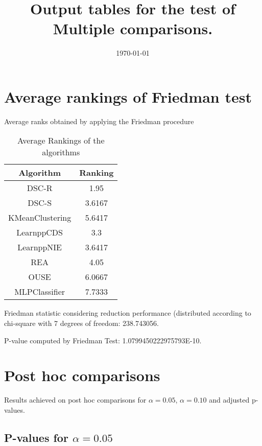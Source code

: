 \documentclass[a4paper,10pt]{article}
\title{Output tables for the test of Multiple comparisons.}
\author{}
\date{\today}
\begin{document}
\begin{landscape}
\pagestyle{empty}
\maketitle
\thispagestyle{empty}
\section{Average rankings of Friedman test}



Average ranks obtained by applying the Friedman procedure

\begin{table}[!htp]
\centering
\begin{tabular}{|c|c|}\hline
Algorithm&Ranking\\\hline
DSC-R & 1.95\\
DSC-S & 3.6167\\
KMeanClustering & 5.6417\\
LearnppCDS & 3.3\\
LearnppNIE & 3.6417\\
REA & 4.05\\
OUSE & 6.0667\\
MLPClassifier & 7.7333\\
\hline
\end{tabular}
\caption{Average Rankings of the algorithms}
\end{table}

Friedman statistic considering reduction performance (distributed according to chi-square with 7 degrees of freedom: 238.743056.

P-value computed by Friedman Test: 1.0799450222975793E-10.\newline



\pagebreak

\section{Post hoc comparisons}

Results achieved on post hoc comparisons for $\alpha = 0.05$, $\alpha = 0.10$ and adjusted p-values.

\subsection{P-values for $\alpha=0.05$}


\end{landscape}
\end{document}
